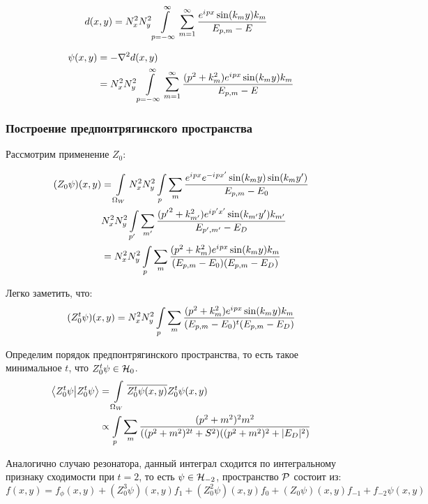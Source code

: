\begin{align*}
d(x, y) 
&= N_x^2 N_y^2 \int\limits_{p = -\infty}^\infty \sum\limits_{m = 1}^\infty \frac{e^{{i\mkern1mu} p x} \sin(k_m y) k_m }{E_{p, m} - E}
\end{align*}

\begin{align*}
\psi(x, y) 
&= -\laplacian d(x, y) \\
&= N_x^2 N_y^2 \int\limits_{p = -\infty}^\infty \sum\limits_{m = 1}^\infty \frac{(p^2 + k_m^2) e^{\iu p x} \sin(k_m y) k_m }{E_{p, m} - E}
\end{align*}

\subsubsection{Построение предпонтрягинского пространства}
Рассмотрим применение $Z_0$:

\begin{align*}
(Z_0 \psi)(x, y)
&= \int\limits_{\Omega_W} N_x^2 N_y^2 \int\limits_p \sum\limits_m \frac{e^{{i\mkern1mu} p x} e^{-{i\mkern1mu} p x'} \sin(k_m y) \sin(k_m y')}{E_{p, m} - E_0} \\
&  N_x^2 N_y^2 \int\limits_{p'} \sum\limits_{m'} \frac{({p'}^2 + k_{m'}^2) e^{{i\mkern1mu} p' x'} \sin(k_{m'} y') k_{m'} }{E_{p', m'} - E_D} \\
&= N_x^2 N_y^2 \int\limits_p \sum\limits_m \frac{(p^2 + k_m^2) e^{{i\mkern1mu} p x} \sin(k_m y) k_m}{(E_{p, m} - E_0) (E_{p, m} - E_D)}
\end{align*}

Легко заметить, что:
\begin{align*}
(Z_0^t \psi)(x, y) =
N_x^2 N_y^2 \int\limits_p \sum\limits_m \frac{(p^2 + k_m^2) e^{{i\mkern1mu} p x} \sin(k_m y) k_m}{(E_{p, m} - E_0)^t (E_{p, m} - E_D)}
\end{align*}

Определим порядок предпонтрягинского пространства, то есть такое минимальное $t$, что $Z_0^t \psi \in \mathcal{H}_{0}$.
\begin{align*}
\ip{Z_0^t \psi}{Z_0^t \psi}
&= \int\limits_{\Omega_W} \cconj{Z_0^t \psi(x, y)} Z_0^t \psi(x, y) \\
&\propto \int\limits_p \sum\limits_m \frac{(p^2 + m^2)^2 m^2}{((p^2 + m^2)^{2t} + S^2 ) ((p^2 + m^2)^2 + |E_D|^2)}
\end{align*}

Аналогично случаю резонатора, данный интеграл сходится по интегральному признаку сходимости при $t = 2$, то есть $\psi \in \mathcal{H}_{-2}$, пространство $\mathcal{P}$ состоит из:
\[
f(x, y) = f_\phi(x, y) + (Z_0^3 \psi)(x, y) f_1 + (Z_0^2 \psi)(x, y) f_0 + (Z_0 \psi)(x, y) f_{-1} + f_{-2} \psi(x, y)
\]

